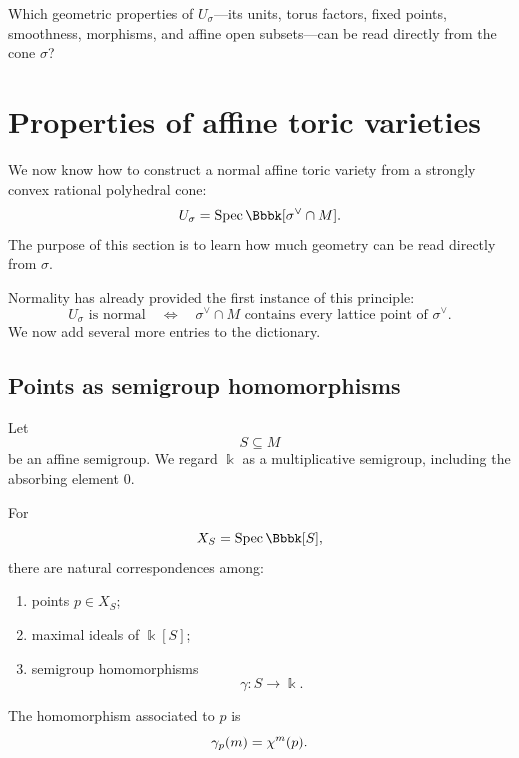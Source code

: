 \begin{guidingquestion}
Which geometric properties of \(U_\sigma\)—its units, torus factors,
fixed points, smoothness, morphisms, and affine open subsets—can be
read directly from the cone \(\sigma\)?
\end{guidingquestion}


\section{Properties of affine toric varieties}
\label{sec:properties-affine-toric-varieties}

We now know how to construct a normal affine toric variety from a
strongly convex rational polyhedral cone:
\[
U_\sigma
=
\Spec\Bbbk[\sigma^\vee\cap M].
\]
The purpose of this section is to learn how much geometry can be read
directly from \(\sigma\).

Normality has already provided the first instance of this principle:
\[
U_\sigma\text{ is normal}
\quad\Longleftrightarrow\quad
\sigma^\vee\cap M\text{ contains every lattice point of }\sigma^\vee.
\]
We now add several more entries to the dictionary.

\subsection{Points as semigroup homomorphisms}

Let
\[
S\subseteq M
\]
be an affine semigroup. We regard \(\Bbbk\) as a multiplicative
semigroup, including the absorbing element \(0\).

\begin{proposition}
\label{prop:points-semigroup-homomorphisms}
For
\[
X_S=\Spec\Bbbk[S],
\]
there are natural correspondences among:
\begin{enumerate}[label=(\alph*),wide=0pt]
\item points \(p\in X_S\);
\item maximal ideals of \(\Bbbk[S]\);
\item semigroup homomorphisms
\[
\gamma:S\longrightarrow\Bbbk.
\]
\end{enumerate}
The homomorphism associated to \(p\) is
\[
\gamma_p(m)=\chi^{m}(p).
\]
\end{proposition}

